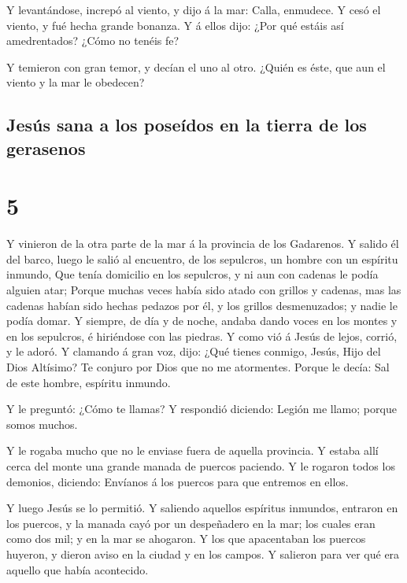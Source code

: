  Y levantándose, increpó al viento, y dijo á la mar:
Calla, enmudece. Y cesó el viento, y fué hecha grande bonanza.
 Y á ellos dijo: ¿Por qué estáis así amedrentados? ¿Cómo
no tenéis fe?

 Y temieron con gran temor, y decían el uno al otro.
¿Quién es éste, que aun el viento y la mar le obedecen?

\hypertarget{jesuxfas-sana-a-los-poseuxeddos-en-la-tierra-de-los-gerasenos}{%
\subsection{Jesús sana a los poseídos en la tierra de los
gerasenos}\label{jesuxfas-sana-a-los-poseuxeddos-en-la-tierra-de-los-gerasenos}}

\hypertarget{section-4}{%
\section{5}\label{section-4}}

 Y vinieron de la otra parte de la mar á la provincia de
los Gadarenos.  Y salido él del barco, luego le salió al
encuentro, de los sepulcros, un hombre con un espíritu inmundo,
 Que tenía domicilio en los sepulcros, y ni aun con
cadenas le podía alguien atar;  Porque muchas veces había
sido atado con grillos y cadenas, mas las cadenas habían sido hechas
pedazos por él, y los grillos desmenuzados; y nadie le podía domar.
 Y siempre, de día y de noche, andaba dando voces en los
montes y en los sepulcros, é hiriéndose con las piedras. 
Y como vió á Jesús de lejos, corrió, y le adoró.  Y
clamando á gran voz, dijo: ¿Qué tienes conmigo, Jesús, Hijo del Dios
Altísimo? Te conjuro por Dios que no me atormentes. 
Porque le decía: Sal de este hombre, espíritu inmundo.

 Y le preguntó: ¿Cómo te llamas? Y respondió diciendo:
Legión me llamo; porque somos muchos.

 Y le rogaba mucho que no le enviase fuera de aquella
provincia.  Y estaba allí cerca del monte una grande
manada de puercos paciendo.  Y le rogaron todos los
demonios, diciendo: Envíanos á los puercos para que entremos en ellos.

 Y luego Jesús se lo permitió. Y saliendo aquellos
espíritus inmundos, entraron en los puercos, y la manada cayó por un
despeñadero en la mar; los cuales eran como dos mil; y en la mar se
ahogaron.  Y los que apacentaban los puercos huyeron, y
dieron aviso en la ciudad y en los campos. Y salieron para ver qué era
aquello que había acontecido.

